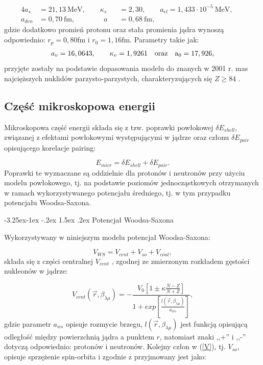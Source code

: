 \documentclass[a4paper,polish]{article}
\makeatletter
\renewcommand\subsubsection{\@startsection{subsubsection}{3}{\z@}%
	{-3.25ex\@plus -1ex \@minus -.2ex}%
	{1.5ex \@plus .2ex}%
	{\normalfont\normalsize\bfseries\boldmath}}
\numberwithin{equation}{section}
\makeatother
\begin{document}
\begin{alignat*}{4}
a_s&=21,13~\mathrm{MeV}, \qquad \kappa_{s}&&=2,30, \qquad a_{el}=1,433 \cdot 10^{-5}~\mathrm{MeV}, &&\\
a_{den}&=0,70~\mathrm{fm}, \qquad \qquad a&&=0,68~\mathrm{fm},
\end{alignat*}
gdzie dodatkowo promień protonu oraz stała promienia jądra wynoszą odpowiednio: $r_p=0,80\mathrm{fm}$ i $r_0=1,16\mathrm{fm}$. Parametry takie jak:
\begin{gather*}
a_v=16,0643, \qquad \kappa_v=1,9261 \quad \rm{oraz} \quad a_0=17,926, 
\end{gather*}
przyjęte zostały na podstawie dopasowania modelu do znanych w 2001 r. mas najcięższych nuklidów parzysto-parzystych, charakteryzujących się $Z \ge 84$ \cite{Muntian}.


\subsection{Część mikroskopowa energii}
Mikroskopowa część energii składa się z tzw. poprawki powłokowej $\delta E_{shell}$, związanej z efektami powłokowymi występującymi w jądrze oraz członu $\delta E_{pair}$ opisującego korelacje pairing:

\begin{equation}
E_{micr}=\delta E_{shell}+\delta E_{pair}.
\end{equation}
Poprawki te wyznaczane są oddzielnie dla protonów i neutronów przy użyciu modelu powłokowego, tj. na podstawie poziomów jednocząstkowych otrzymanych w ramach wykorzystywanego potencjału średniego, tj. w tym przypadku potencjału Woodsa-Saxona.


\subsubsection{Potencjał Woodsa-Saxona}

Wykorzystywany w niniejszym modelu potencjał Woodsa-Saxona:

\begin{equation}\label{V}
V_{WS}=V_{cent}+V_{so}+V_{coul},
\end{equation}
składa się z części centralnej $V_{cent}$ \cite{WS}, zgodnej ze zmierzonym rozkładem gęstości nukleonów w jądrze: 

\begin{equation}
V_{cent}(\vec{r},\beta_{\lambda \mu}) =  - \frac{V_0 \left[ 1 \pm \kappa \frac{N-Z}{N+Z} \right]}{1+exp \left [ \frac {l(\vec{r},\beta_{\lambda \mu})}{a_{ws}} \right ]},
\end{equation}
gdzie parametr $a_{ws}$ opisuje rozmycie brzegu, $l(\vec{r},\beta_{\lambda \mu})$ jest funkcją opisującą odległość między powierzchnią jądra a punktem $r$, natomiast znaki ,,+'' i ,,-'' dotyczą odpowiednio: protonów i neutronów. Kolejny człon w (\ref{V}), tj. $V_{so}$, opisuje sprzężenie spin-orbita i zgodnie z \cite{WS} przyjmowany jest jako: 
\end{document}
